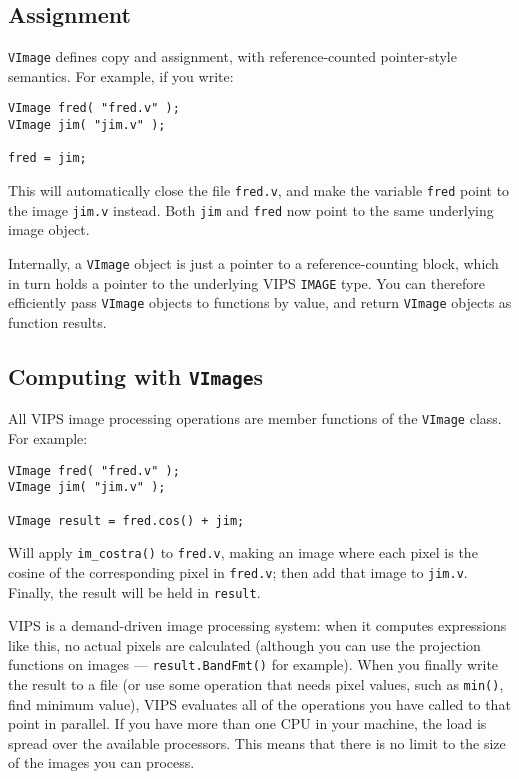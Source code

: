 \subsection{Assignment}

\verb+VImage+ defines copy and assignment, with reference-counted
pointer-style semantics.  For example, if you write:

\begin{verbatim}
VImage fred( "fred.v" );
VImage jim( "jim.v" );

fred = jim;
\end{verbatim}

This will automatically close the file \verb+fred.v+, and make the variable
\verb+fred+ point to the image \verb+jim.v+ instead. Both \verb+jim+ and
\verb+fred+ now point to the same underlying image object. 

Internally, a \verb+VImage+ object is just a pointer to a reference-counting
block, which in turn holds a pointer to the underlying VIPS \verb+IMAGE+ type.
You can therefore efficiently pass \verb+VImage+ objects to functions by
value, and return \verb+VImage+ objects as function results.

\subsection{Computing with \texttt{VImage}s}
\label{sec:compute}

All VIPS image processing operations are member functions of the \verb+VImage+
class. For example:

\begin{verbatim}
VImage fred( "fred.v" );
VImage jim( "jim.v" );

VImage result = fred.cos() + jim;
\end{verbatim}

Will apply \verb+im_costra()+ to \verb+fred.v+, making an image where each
pixel is the cosine of the corresponding pixel in \verb+fred.v+; then add that
image to \verb+jim.v+. Finally, the result will be held in \verb+result+.

VIPS is a demand-driven image processing system: when it computes expressions
like this, no actual pixels are calculated (although you can use the
projection functions on images --- \verb+result.BandFmt()+ for example).  When
you finally write the result to a file (or use some operation that needs pixel
values, such as \verb+min()+, find minimum value), VIPS evaluates all of the
operations you have called to that point in parallel. If you have more than one
CPU in your machine, the load is spread over the available processors. This
means that there is no limit to the size of the images you can process.

